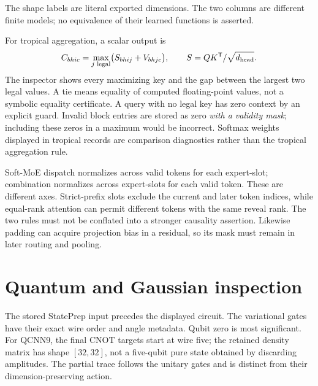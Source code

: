 \begin{center}
\end{center}
The shape labels are literal exported dimensions. The two columns are
different finite models; no equivalence of their learned functions is
asserted.

For tropical aggregation, a scalar output is
\[
 C_{bhic}=\max_{j\text{ legal}}
       \bigl(S_{bhij}+V_{bhjc}\bigr),\qquad
 S=QK^{\mathsf{T}}/\sqrt{d_{\rm head}}.
\]
The inspector shows every maximizing key and the gap between the largest
two legal values. A tie means equality of computed floating-point values,
not a symbolic equality certificate. A query with no legal key has zero
context by an explicit guard. Invalid block entries are stored as zero
\emph{with a validity mask}; including these zeros in a maximum would be
incorrect. Softmax weights displayed in tropical records are comparison
diagnostics rather than the tropical aggregation rule.

Soft-MoE dispatch normalizes across valid tokens for each expert-slot;
combination normalizes across expert-slots for each valid token. These are
different axes. Strict-prefix slots exclude the current and later token
indices, while equal-rank attention can permit different tokens with the
same reveal rank. The two rules must not be conflated into a stronger
causality assertion. Likewise padding can acquire projection bias in a
residual, so its mask must remain in later routing and pooling.

\section{Quantum and Gaussian inspection}
The stored StatePrep input precedes the displayed circuit. The variational
gates have their exact wire order and angle metadata. Qubit zero is most
significant. For QCNN9, the final CNOT targets start at wire five; the
retained density matrix has shape $[32,32]$, not a five-qubit pure state
obtained by discarding amplitudes. The partial trace follows the unitary
gates and is distinct from their dimension-preserving action.

